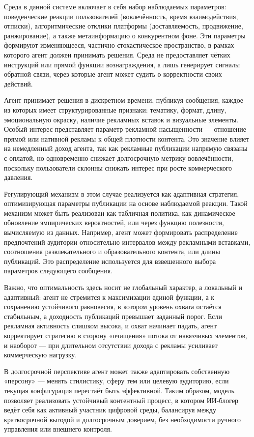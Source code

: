 \documentclass[
    14pt,
    specialist,
    candidate, %
    subf, %
    href,
    dotsinheaders=false
]{disser}
\begin{document}
Среда в данной системе включает в себя набор наблюдаемых параметров: поведенческие реакции пользователей (вовлечённость, время взаимодействия, отписки), алгоритмические отклики платформы (доставляемость, продвижение, ранжирование), а также метаинформацию о конкурентном фоне. Эти параметры формируют изменяющееся, частично стохастическое пространство, в рамках которого агент должен принимать решения. Среда не предоставляет чётких инструкций или прямой функции вознаграждения, а лишь генерирует сигналы обратной связи, через которые агент может судить о корректности своих действий.

Агент принимает решения в дискретном времени, публикуя сообщения, каждое из которых имеет структурированные признаки: тематику, формат, длину, эмоциональную окраску, наличие рекламных вставок и визуальные элементы. Особый интерес представляет параметр рекламной насыщенности — отношение прямой или нативной рекламы к общей плотности контента. Это значение влияет на немедленный доход агента, так как рекламные публикации напрямую связаны с оплатой, но одновременно снижает долгосрочную метрику вовлечённости, поскольку пользователи склонны снижать интерес при росте коммерческого давления.

Регулирующий механизм в этом случае реализуется как адаптивная стратегия, оптимизирующая параметры публикации на основе наблюдаемой реакции. Такой механизм может быть реализован как табличная политика, как динамическое обновление эмпирических вероятностей, или через функцию полезности, вычисляемую из данных. Например, агент может формировать распределение предпочтений аудитории относительно интервалов между рекламными вставками, соотношения развлекательного и образовательного контента, или длины публикаций. Это распределение используется для взвешенного выбора параметров следующего сообщения.

Важно, что оптимальность здесь носит не глобальный характер, а локальный и адаптивный: агент не стремится к максимизации единой функции, а к сохранению устойчивого равновесия, в котором уровень охвата остаётся стабильным, а доходность публикаций превышает заданный порог. Если рекламная активность слишком высока, и охват начинает падать, агент корректирует стратегию в сторону «очищения» потока от навязчивых элементов, и наоборот — при длительном отсутствии дохода с рекламы усиливает коммерческую нагрузку.

В долгосрочной перспективе агент может также адаптировать собственную «персону» — менять стилистику, сферу тем или целевую аудиторию, если текущая конфигурация перестаёт быть эффективной. Таким образом, модель позволяет реализовать устойчивый контентный процесс, в котором ИИ-блогер ведёт себя как активный участник цифровой среды, балансируя между краткосрочной выгодой и долгосрочным доверием, без необходимости ручного управления или внешнего контроля.
\end{document}
